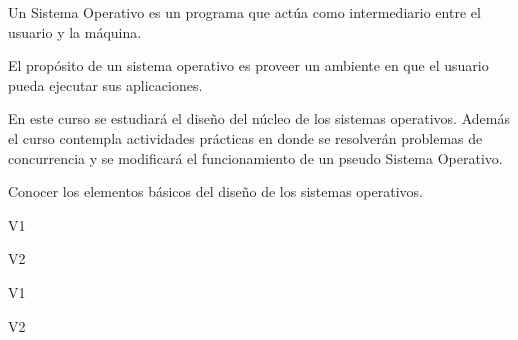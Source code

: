 \begin{syllabus}


\begin{justification}
Un Sistema Operativo es un programa que actúa como intermediario entre el usuario y la máquina.

El propósito de un sistema operativo es proveer un ambiente en que el usuario pueda ejecutar sus aplicaciones.

En este curso se estudiará el diseño del núcleo de los sistemas operativos.
Además el curso contempla actividades prácticas en donde se resolverán problemas de
concurrencia y se modificará el funcionamiento de un pseudo Sistema Operativo.
\end{justification}

\begin{goals}
	\item Conocer los elementos básicos del diseño de los sistemas operativos.
\end{goals}

\begin{outcomes}{V1}
    \item {}
\end{outcomes}

\begin{outcomes}{V2}
    \item {}
    \item {}
    \item {}
\end{outcomes}

\begin{competences}{V1}
    \item {}
    \item {}
    \item {}
\end{competences}

\begin{competences}{V2}
    \item {}
    \item {}
    \item {}
\end{competences}


\end{syllabus}
